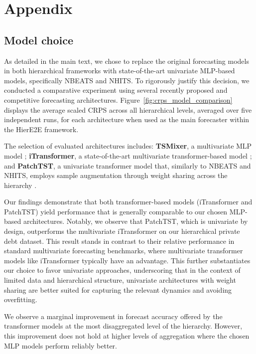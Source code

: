 \documentclass[letterpaper]{article}
\begin{document}
\newpage






\clearpage
\onecolumn
\appendix
\section{Appendix}
\subsection{Model choice}
As detailed in the main text, we chose to replace the original forecasting models in both hierarchical frameworks with state-of-the-art univariate MLP-based models, specifically NBEATS and NHITS. To rigorously justify this decision, we conducted a comparative experiment using several recently proposed and competitive forecasting architectures. Figure~\ref{fig:crps_model_comparison} displays the average scaled CRPS across all hierarchical levels, averaged over five independent runs, for each architecture when used as the main forecaster within the HierE2E framework.

The selection of evaluated architectures includes: \textbf{TSMixer}, a multivariate MLP model \cite{TSmixer}; \textbf{iTransformer}, a state-of-the-art multivariate transformer-based model \cite{itransformer}; and \textbf{PatchTST}, a univariate transformer model that, similarly to NBEATS and NHITS, employs sample augmentation through weight sharing across the hierarchy \cite{PatchTST}.

Our findings demonstrate that both transformer-based models (iTransformer and PatchTST) yield performance that is generally comparable to our chosen MLP-based architectures. Notably, we observe that PatchTST, which is univariate by design, outperforms the multivariate iTransformer on our hierarchical private debt dataset. This result stands in contrast to their relative performance in standard multivariate forecasting benchmarks, where multivariate transformer models like iTransformer typically have an advantage. This further substantiates our choice to favor univariate approaches, underscoring that in the context of limited data and hierarchical structure, univariate architectures with weight sharing are better suited for capturing the relevant dynamics and avoiding overfitting.

 We observe a marginal improvement in forecast accuracy offered by the transformer models at the most disaggregated level of the hierarchy. However, this improvement does not hold at higher levels of aggregation where the chosen MLP models perform reliably better.
 
\end{document}

